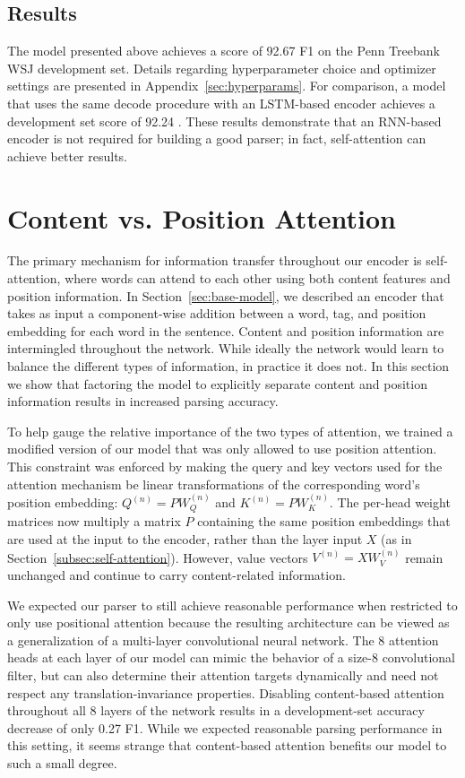 \documentclass[11pt,a4paper]{article}
\begin{document}
\subsection{Results}

The model presented above achieves a score of 92.67 F1 on the Penn Treebank WSJ development set. Details regarding hyperparameter choice and optimizer settings are presented in Appendix~\ref{sec:hyperparams}.
For comparison, a model that uses the same decode procedure with an LSTM-based encoder achieves a development set score of 92.24 \citep{gaddy_analysis_2018}. These results demonstrate that an RNN-based encoder is not required for building a good parser; in fact, self-attention can achieve better results.
  
\section{Content vs. Position Attention}
\label{sec:factored-model}

The primary mechanism for information transfer throughout our encoder is self-attention, where words can attend to each other using both content features and position information. In Section~\ref{sec:base-model}, we described an encoder that takes as input a component-wise addition between a word, tag, and position embedding for each word in the sentence. Content and position information are intermingled throughout the network. While ideally the network would learn to balance the different types of information, in practice it does not. In this section we show that factoring the model to explicitly separate content and position information results in increased parsing accuracy. 

To help gauge the relative importance of the two types of attention, we trained a modified version of our model that was only allowed to use position attention. This constraint was enforced by making the query and key vectors used for the attention mechanism be linear transformations of the corresponding word's position embedding: $Q^{(n)} = PW_Q^{(n)}$ and $K^{(n)} = PW_K^{(n)}$. The per-head weight matrices now multiply a matrix $P$ containing the same position embeddings that are used at the input to the encoder, rather than the layer input $X$ (as in Section~\ref{subsec:self-attention}). However, value vectors $V^{(n)}=XW_V^{(n)}$ remain unchanged and continue to carry content-related information.

We expected our parser to still achieve reasonable performance when restricted to only use positional attention because the resulting architecture can be viewed as a generalization of a multi-layer convolutional neural network. The 8 attention heads at each layer of our model can mimic the behavior of a size-8 convolutional filter, but can also determine their attention targets dynamically and need not respect any translation-invariance properties. Disabling content-based attention throughout all 8 layers of the network results in a development-set accuracy decrease of only 0.27 F1. While we expected reasonable parsing performance in this setting, it seems strange that content-based attention benefits our model to such a small degree.
\end{document}
